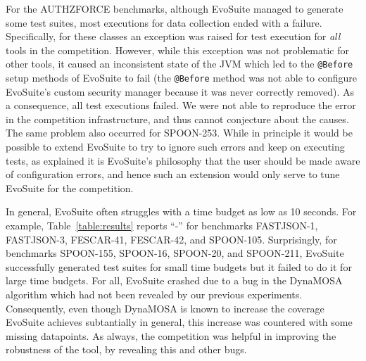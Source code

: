 \documentclass[sigconf,table]{acmart}
\newcommand{\TODO}[1]{\textbf{\textcolor{ScarletRed}{[TODO: #1]}}\xspace}
\newcommand{\TODO}[1]{}
\newcommand{\EVOSUITE}{{\sc EvoSuite}\xspace}
\begin{document}
For the AUTHZFORCE benchmarks, although \EVOSUITE managed to generate
some test suites, most executions for data collection ended with a
failure. Specifically, for these classes an exception was raised for
test execution for \emph{all} tools in the competition. However,
while this exception was not problematic for other tools, it caused
an inconsistent state of the JVM which led to the \texttt{@Before}
setup methods of \EVOSUITE to fail (the \texttt{@Before} method was
not able to configure \EVOSUITE's custom security manager because it
was never correctly removed). As a consequence, all test executions
failed. We were not able to reproduce the error in the competition
infrastructure, and thus cannot conjecture about the causes. The same
problem also occurred for SPOON-253. While in principle it would be
possible to extend \EVOSUITE to try to ignore such errors and keep on
executing tests, as explained it is \EVOSUITE's philosophy that the
user should be made aware of configuration errors, and hence such an
extension would only serve to tune \EVOSUITE for the competition.

In general, \EVOSUITE often struggles with a time budget as low as 10
seconds. For example, Table~\ref{table:results} reports ``-'' for
benchmarks FASTJSON-1, FASTJSON-3, FESCAR-41, FESCAR-42, and
SPOON-105.
%
Surprisingly, for benchmarks SPOON-155, SPOON-16, SPOON-20, and
SPOON-211, \EVOSUITE successfully generated test suites for small
time budgets but it failed to do it for large time budgets. For all,
\EVOSUITE crashed due to a bug in the DynaMOSA algorithm which had
not been revealed by our previous experiments. Consequently, even
though DynaMOSA is known to increase the coverage \EVOSUITE achieves
subtantially in general, this increase was countered with some
missing datapoints. As always, the competition was helpful in
improving the robustness of the tool, by revealing this and other
bugs.
\end{document}

